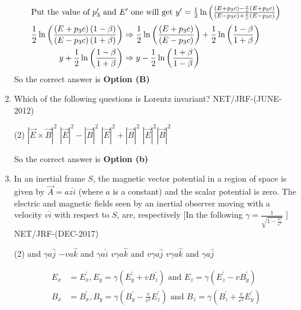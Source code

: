 \begin{enumerate}
\begin{answer}
\begin{align*}
\intertext{Put the value of $p_{3}^{\prime}$ and $E^{\prime}$ one will get $y^{\prime}=\frac{1}{2} \ln \left(\frac{\left(E+p_{3} c\right)-\frac{v}{c}\left(E+p_{3} c\right)}{\left(E-p_{3} c\right)+\frac{v}{c}\left(E-p_{3} c\right)}\right)$}
\frac{1}{2} \ln \left(\frac{\left(E+p_{3} c\right)(1-\beta)}{\left(E-p_{3} c\right)(1+\beta)}\right) &\Rightarrow \frac{1}{2} \ln \left(\frac{\left(E+p_{3} c\right)}{\left(E-p_{3} c\right)}\right)+\frac{1}{2} \ln \left(\frac{1-\beta}{1+\beta}\right)\\
y+\frac{1}{2} \ln \left(\frac{1-\beta}{1+\beta}\right) &\Rightarrow y-\frac{1}{2} \ln \left(\frac{1+\beta}{1-\beta}\right)
\end{align*}
So the correct answer is \textbf{Option (B)}
\end{answer}
	\item Which of the following questions is Lorentz invariant?
{	NET/JRF-(JUNE-2012)}
 \begin{tasks}(2)
	\task[\textbf{a.}]$|\vec{E} \times \vec{B}|^{2}$
	\task[\textbf{b.}] $|\vec{E}|^{2}-|\vec{B}|^{2}$
	\task[\textbf{c.}]$|\vec{E}|^{2}+|\vec{B}|^{2}$
	\task[\textbf{d.}] $|\vec{E}|^{2}|\vec{B}|^{2}$
\end{tasks}
\begin{answer}
	So the correct answer is \textbf{Option (b)}
\end{answer}
\item In an inertial frame $S$, the magnetic vector potential in a region of space is given by $\vec{A}=a z \hat{i}$ (where $a$ is a constant) and the scalar potential is zero. The electric and magnetic fields seen by an inertial observer moving with a velocity $v \hat{i}$ with respect to $S$, are, respectively [In the following $\gamma=\frac{1}{\sqrt{1-\frac{v^{2}}{c^{2}}}}$ ] 
{NET/JRF-(DEC-2017)}
 \begin{tasks}(2)
	 and $\gamma a \hat{j}$
	\task[\textbf{b.}]$-v a \hat{k}$ and $\gamma a \hat{i}$
	\task[\textbf{c.}]$v \gamma a \hat{k}$ and $v \gamma a \hat{j}$
	\task[\textbf{d.}] $v \gamma a \hat{k}$ and $\gamma a \hat{j}$
\end{tasks}
\begin{answer}
	\begin{align*}
	E_{x}&=E_{x}^{\prime}, E_{y}=\gamma\left(E_{y}^{\prime}+v B_{z}^{\prime}\right) \text { and } E_{z}=\gamma\left(E_{z}^{\prime}-v B_{y}^{\prime}\right)\\
	B_{x}&=B_{x}^{\prime}, B_{y}=\gamma\left(B_{y}^{\prime}-\frac{v}{c^{2}} E_{z}^{\prime}\right) \text { and } B_{z}=\gamma\left(B_{z}^{\prime}+\frac{v}{c^{2}} E_{y}^{\prime}\right)\\

\end{align*}
\end{answer}
\end{enumerate}
